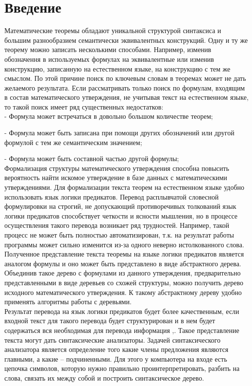 \documentclass[12pt]{article}
\begin{document}
\section*{Введение}
Математические теоремы обладают уникальной структурой синтаксиса и большим разнообразием семантически эквивалентных конструкций. Одну и ту же теорему можно записать несколькими способами. Например, изменив обозначення  в используемых формулах на эквивалентные или изменив конструкцию, записанную на естественном языке, на конструкцию с тем же смыслом. По этой причине поиск по ключевым словам в теоремах может не дать желаемого результата. Если рассматривать только поиск по формулам, входящим в состав математического утверждения, не учитывая текст на естественном языке, то такой поиск имеет ряд существенных недостатков: \\

- Формула может встречаться в довольно большом количестве теорем;

- Формула может быть записана при помощи других обозначений или другой формулой с тем же семантическим значением;

- Формула может быть составной частью другой формулы;\\

Формализация структуры математического утверждения способна повысить вероятность найти искомое утверждение в базе данных с математическими утверждениями. Для формализации текста теорем на естественном языке удобно использовать язык логики предикатов. Перевод расплывчатой словесной формулировки на строгий, не допускающий противоречивых толкований язык логики предикатов способствует четкости и ясности мышления, но в процессе осуществления такого перевода возникает ряд трудностей. Например, такой процесс не может быть полностью автоматизирован, т.к. на результат работы программы может сильно изменится из-за одного неверно истолкованного слова. \\

Полученное представление текста теоремы на языке логики предикатов является аналогом формулы и оно может быть представлено в виде абстрактного дерева. Объединив такое дерево с формулами из данного утверждения, предварительно представленными в виде деревьев со схожей структуры,  можно получить дерево исходного математического утверждения. К такому абстрактному дереву удобно применять алгоритмы работы с деревьями.\\

Результат перевода на язык логики предикатов будет более качественным, если входной текст для такого перевода будет структурирован и в нем будет содержаться вся необходимая для перевода информация \cite{author11},\cite{author12}. Такое представление текста могут дать синтаксические анализаторы. Задачей синтаксического анализатора является определение того какие члены предложения являются главными, а какие – подчиненными. Для этого у компьютера на входе есть цепочка символов, которую нужно правильно проинтерпретировать, разбить на слова, связать их между собой и построить синтаксическое дерево. \\
\end{document}
